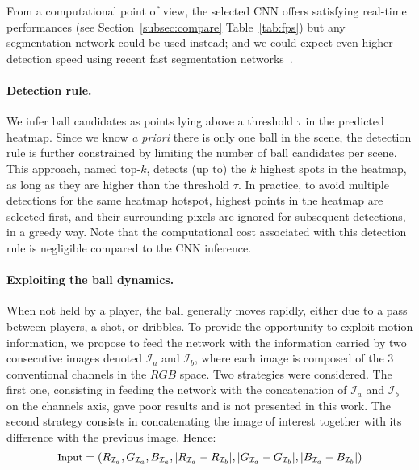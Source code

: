 \documentclass[sigconf, screen]{acmart}
\begin{document}
From a computational point of view, the selected CNN offers satisfying real-time performances (see Section~\ref{subsec:compare} Table~\ref{tab:fps}) but any segmentation network could be used instead; and we could expect even higher detection speed using recent fast segmentation networks~\cite{Yu2018,Mazzini2019,Poudel2019}.

\paragraph{Detection rule.}
We infer ball candidates as points lying above a threshold $\tau$ in the predicted heatmap. Since we know {\it a priori} there is only one ball in the scene, the detection rule is further constrained by limiting the number of ball candidates per scene. This approach, named top-$k$, detects (up to) the $k$ highest spots in the heatmap, as long as they are higher than the threshold $\tau$. In practice, to avoid multiple detections for the same heatmap hotspot, highest points in the heatmap are selected first, and their surrounding pixels are ignored for subsequent detections, in a greedy way.
Note that the computational cost associated with this detection rule is negligible compared to the CNN inference.

\paragraph{Exploiting the ball dynamics.}
When not held by a player, the ball generally moves rapidly, either due to a pass between players, a shot, or dribbles. To provide the opportunity to exploit motion information, we propose to feed the network with the information carried by two consecutive images denoted $\mathcal{I}_a$ and $\mathcal{I}_b$, where each image is composed of the 3 conventional channels in the $RGB$ space.
Two strategies were considered. The first one, consisting in feeding the network with the concatenation of $\mathcal{I}_a$ and $\mathcal{I}_b$ on the channels axis, gave poor results and is not presented in this work. The second strategy consists in concatenating the image of interest together with its difference with the previous image. Hence:
\begin{equation}
    \small
  \text{Input} =
  \left(R_{\mathcal{I}_a},G_{\mathcal{I}_a},B_{\mathcal{I}_a},
  \lvert R_{\mathcal{I}_a}-R_{\mathcal{I}_b}\rvert ,
  \lvert G_{\mathcal{I}_a}-G_{\mathcal{I}_b}\rvert,
  \lvert B_{\mathcal{I}_a}-B_{\mathcal{I}_b}\rvert \right)
\label{eq:diff}
\end{equation}
\end{document}
